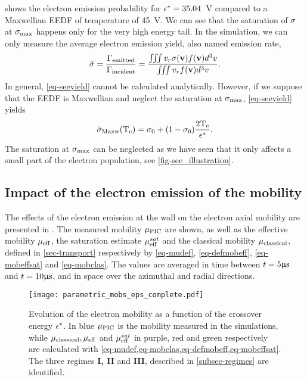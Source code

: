   shows the electron emission probability for $\epsilon^{*}=35.04$~V compared to a Maxwellian \ac{EEDF} of temperature of 45~V.
  We can see that the saturation of $\sigma $ at $\sigma _{\rm max} $ happens only for the very high energy tail.
  In the simulation, we can only measure the average electron emission yield, also named emission rate, 
  \begin{equation} \label{eq-seeyield}
     \bar{\sigma } = \frac{\Gamma_{\rm emitted}}{\Gamma_{\rm incident}} = \frac{\iiint v_r \sigma ({\mathbf v}) f({\mathbf v}) d^3v}{\iiint v_r  f({\mathbf v}) d^3v}.
  \end{equation}
  In general, \cref{eq-seeyield} cannot be calculated analytically.
  However, if we suppose that the \ac{EEDF} is Maxwellian and neglect the saturation at $\sigma _{\rm max} $, \cref{eq-seeyield} yields
  \begin{equation} \label{eq-seemaxw}
     \bar{\sigma }_{\rm Maxw}(\mathrm{T_e}) = \sigma _0 + (1 - \sigma _0) \frac{2 \mathrm{T_e}}{\epsilon^{*}}.
  \end{equation}
  The saturation at $\sigma _{\rm max} $ can be neglected as we have seen that it only affects a small part of the electron population, see \cref{fig-see_illustration}.
  
  \subsection{Impact of the electron emission of the mobility} \label{subsec-param-mob}
    
  The effects of the electron emission at the wall on the electron axial mobility are presented in .
  The measured mobility $\mu_{\mathrm{PIC}}$ are shown, as well as the effective mobility $\mu_{\mathrm{eff}}$, the saturation estimate $\mu_{\mathrm{eff}}^{sat}$ and the classical mobility $\mu_{\mathrm{classical}}$, defined in \cref{sec-transport} respectively by \cref{eq-mudef}, \cref{eq-defmobeff}, \cref{eq-mobeffsat} and \cref{eq-mobclas}.
  The values are averaged in time between $t=5 \mathrm{\upmu s}$ and $t=10\mathrm{\upmu s}$, and in space over the azimuthal and radial directions.
  \begin{figure}[hbt]
    \centering
    \texttt{[image: parametric\_mobs\_eps\_complete.pdf]}
    \caption{Evolution of the electron mobility as a function of the crossover energy $\epsilon^{*}$. In blue $\mu_{\mathrm{PIC}}$ is the mobility measured in the simulations, while $\mu_{\mathrm{classical}}, \mu_{\mathrm{eff}}$ and $\mu_{\mathrm{eff}}^{sat}$ in purple, red and green respectively are calculated with \cref{eq-mudef,eq-mobclas,eq-defmobeff,eq-mobeffsat}. The three regimes {\bf I, II} and {\bf III}, described in \cref{subsec-regimes} are identified.}
    \label{fig-mob-epsstar}
  \end{figure}
  
